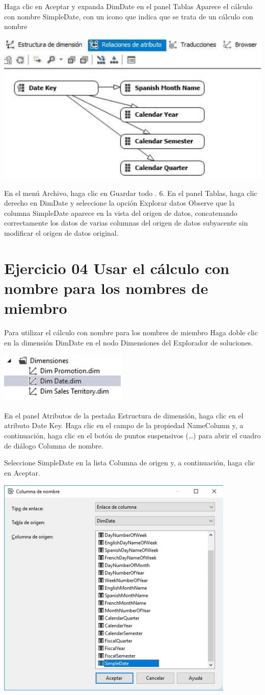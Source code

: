 Haga clic en Aceptar y expanda DimDate en el panel Tablas
Aparece el cálculo con nombre SimpleDate, con un icono que indica que se
trata de un cálculo con nombre
	\begin{center}
	\includegraphics[width=0.5\columnwidth]{images/task2/15}
    \end{center}	
    
En el menú Archivo, haga clic en Guardar todo . 6. En el panel Tablas, haga clic derecho en DimDate y seleccione la opción Explorar datos
Observe que la columna SimpleDate aparece en la vista del origen de datos, concatenando correctamente los
datos de varias columnas del origen de datos subyacente sin modificar el origen de datos original.


	
\section{Ejercicio 04 Usar el cálculo con nombre para los nombres de miembro}

Para utilizar el cálculo con nombre para los nombres de miembro
Haga doble clic en la dimensión DimDate en el nodo Dimensiones del Explorador de soluciones.

	\begin{center}
	\includegraphics[width=0.25\columnwidth]{images/task2/8}
    \end{center}	

En el panel Atributos de la pestaña Estructura de dimensión, haga clic en el atributo Date Key. Haga clic en el campo de la propiedad NameColumn y, a continuación, haga clic en el botón de puntos suspensivos
(…) para abrir el cuadro de diálogo Columna de nombre.

    
Seleccione SimpleDate en la lista Columna de origen y, a continuación, haga clic en Aceptar.

	\begin{center}
	\includegraphics[width=0.5\columnwidth]{images/task2/10}
    \end{center}
    	
